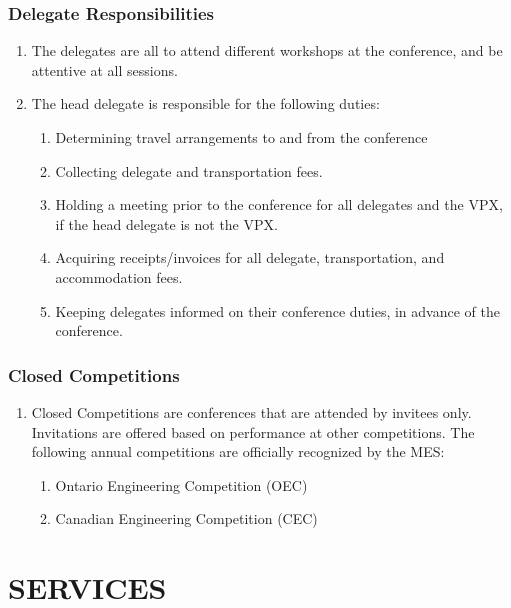 \hypertarget{delegate-responsibilities-1}{%
 \subsubsection{Delegate
  Responsibilities}
 \label{delegate-responsibilities-1}}
\begin{enumerate}
 \item
  The delegates are all to attend different workshops at the conference,
  and be attentive at all sessions.
 \item
  The head delegate is responsible for the following duties:

  \begin{enumerate}
   \item
    Determining travel arrangements to and from the conference
   \item
    Collecting delegate and transportation fees.
   \item
    Holding a meeting prior to the conference for all delegates and the
    VPX, if the head delegate is not the VPX.
   \item
    Acquiring receipts/invoices for all delegate, transportation, and
    accommodation fees.
   \item
    Keeping delegates informed on their conference duties, in advance of
    the conference.

  \end{enumerate}
\end{enumerate}

\hypertarget{closed-competitions}{%
 \subsubsection{Closed Competitions}
 \label{closed-competitions}}
\begin{enumerate}
 \item
  Closed Competitions are conferences that are attended by invitees
  only. Invitations are offered based on performance at other
  competitions. The following annual competitions are officially
  recognized by the MES:

  \begin{enumerate}
   \item
    Ontario Engineering Competition (OEC)
   \item
    Canadian Engineering Competition (CEC)
  \end{enumerate}
\end{enumerate}

\hypertarget{services}{%
 \section{SERVICES}
 \label{services}}

